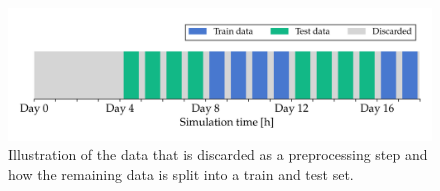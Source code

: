 \begin{figure}[ht]
	\centering
    \includegraphics[width=13.33cm]{img/preprocessing_traintestsplit.png}
	\caption[Illustration of the data that is discarded as a preprocessing step and how the remaining data is split into a train and test set.]{Illustration of the data that is discarded as a preprocessing step and how the remaining data is split into a train and test set.}
	\label{fig:preprocessing-train-test-split}
\end{figure}
